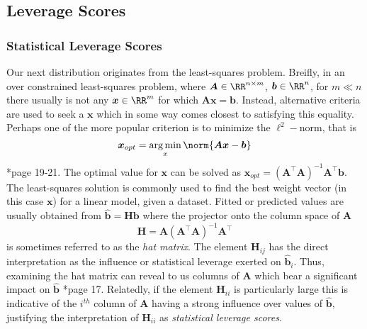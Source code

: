 \subsection{Leverage Scores}\label{Section2.3}

\subsubsection{Statistical Leverage Scores}
Our next distribution originates from the least-squares problem. Breifly, in an over constrained least-squares problem, where $\bm{A} \in \RR^{n \times m}$, $\bm{b} \in \RR^{n}$, for $m \ll n$ there usually is not any $\bm{x} \in \RR^{m}$ for which $\bm{A} \bm{x} = \bm{b}$. Instead, alternative criteria are used to seek a $\bm{x}$ which in some way comes closest to satisfying this equality. Perhaps one of the more popular criterion is to minimize the $\ell^2-$norm, that is
\[
    \bm{x}_{opt} = \argmin_{x} \norm{\bm{A} \bm{x} - \bm{b}}
\]
\cite{DBLP:journals/corr/abs-1104-5557}*{page 19-21}. The optimal value for $\bm{x}$ can be solved as $\bm{x}_{opt} = \left( \bm{A}^{\intercal} \bm{A} \right)^{-1} \bm{A}^{\intercal} \bm{b}$. The least-squares solution is commonly used to find the best weight vector (in this case $\bm{x}$) for a linear model, given a dataset. Fitted or predicted values are usually obtained from $\hat{\bm{b}} = \bm{H} \bm{b}$ where the projector onto the column space of $\bm{A}$
\[
    \bm{H} = \bm{A} \left( \bm{A}^{\intercal} \bm{A} \right)^{-1} \bm{A}^{\intercal}
\]
is sometimes referred to as the {\it hat matrix}. The element $\bm{H}_{ij}$ has the direct interpretation as the influence or statistical leverage exerted on $\hat{\bm{b}}_i$. Thus, examining the hat matrix can reveal to us columns of $\bm{A}$ which bear a significant impact on $\hat{\bm{b}}$ \cite{HoaglinDavidC1978THMi}*{page 17}. Relatedly, if the element $\bm{H}_{ii}$ is particularly large this is indicative of the $i^{th}$ column of $\bm{A}$ having a strong influence over values of $\hat{\bm{b}}$, justifying the interpretation of $\bm{H}_{ii}$ as {\it statistical leverage scores}.

